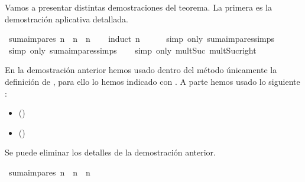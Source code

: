 \begin{isabellebody}
\begin{isamarkuptext}
  Vamos a presentar distintas demostraciones del teorema. La 
  primera es la demostración aplicativa detallada.%
\end{isamarkuptext}\isamarkuptrue%
\isamarkupfalse%
\ {\isachardoublequoteopen}suma{\isacharunderscore}impares\ n\ {\isacharequal}\ n\ {\isacharasterisk}\ n{\isachardoublequoteclose}\isanewline
%
\isadelimproof
\ \ %
\endisadelimproof
%
\isatagproof
{}\isamarkupfalse%
\ {\isacharparenleft}induct\ n{\isacharparenright}\ \isanewline
\ \ \ \isamarkupfalse%
\ {\isacharparenleft}simp\ only{\isacharcolon}\ suma{\isacharunderscore}impares{\isachardot}simps{\isacharparenleft}{}{\isacharparenright}{\isacharparenright}\isanewline
\ \ \isamarkupfalse%
\ {\isacharparenleft}simp\ only{\isacharcolon}\ suma{\isacharunderscore}impares{\isachardot}simps{\isacharparenleft}{}{\isacharparenright}{\isacharparenright}\isanewline
\ \ \isamarkupfalse%
\ {\isacharparenleft}simp\ only{\isacharcolon}\ mult{\isacharunderscore}Suc\ mult{\isacharunderscore}Suc{\isacharunderscore}right{\isacharparenright}\isanewline
\ \ \isamarkupfalse%
%
\endisatagproof
{\isafoldproof}%
%
\isadelimproof
%
\endisadelimproof
%
\begin{isamarkuptext}%
En la demostración anterior hemos usado dentro del método 
 únicamente la definición de ,
 para ello lo  hemos indicado con . A parte hemos
 usado lo siguiente :
  \begin{itemize}
  \item[]  
          \hfill ()
  \end{itemize}
  \begin{itemize}
  \item[]  
          \hfill ()
  \end{itemize}%
\end{isamarkuptext}\isamarkuptrue%
%
\begin{isamarkuptext}%
Se puede eliminar los detalles de la demostración anterior.%
\end{isamarkuptext}\isamarkuptrue%
\isamarkupfalse%
\ {\isachardoublequoteopen}suma{\isacharunderscore}impares\ n\ {\isacharequal}\ n\ {\isacharasterisk}\ n{\isachardoublequoteclose}\isanewline

\end{isabellebody}
